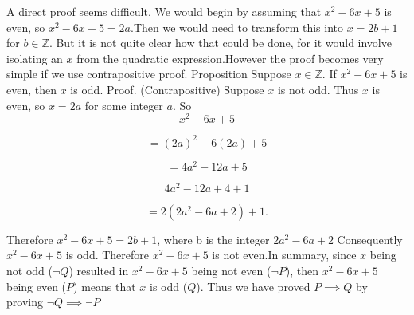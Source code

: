 \documentclass{exam}
\begin{document}
\begin{questions}
\begin{solution}
A direct proof seems difficult. We would begin by assuming that
$x^{2} - 6x + 5$ is even, so $x^{2} - 6x + 5 = 2a$.\newline \newline Then we would need to transform this
into $x = 2b + 1$ for $b \in \mathbb{Z}$. But it is not quite clear how that could be done,
for it would involve isolating an $x$ from the quadratic expression.\newline \newline However
the proof becomes very simple if we use contrapositive proof.\newline \newline
Proposition Suppose $x \in \mathbb{Z}$. If $x^{2} - 6x + 5$ is even, then $x$ is odd. \newline\newline
Proof. (Contrapositive) Suppose $x$ is not odd.
Thus $x$ is even, so $x = 2a$ for some integer $a$.
So
\begin{equation}
     x^{2}-6x+5
\end{equation}

\begin{equation}
  = (2a)^{2}-6(2a)+5
\end{equation}
  
\begin{equation}
    = 4a^{2}-12a+5
\end{equation}

\begin{equation}
    4a^{2} -12a+4+1
\end{equation}

\begin{equation}
      = 2(2a^{2}-6a+2)+1.
\end{equation}

Therefore $x^{2} - 6x + 5 = 2b + 1$, where b is the integer $2a^{2} - 6a + 2$ \newline \newline
Consequently $x^{2} - 6x + 5$ is odd.
Therefore $x^{2} - 6x + 5$ is not even.\newline \newline In summary, since $x$ being not odd ($\neg Q$) resulted in $x^{2} - 6x +5$ being not
even ($\neg P$), then $x^{2} - 6x + 5$ being even ($P$) means that $x$ is odd ($Q$). \newline \newline Thus
we have proved  $P \implies Q$  by proving $\neg Q \implies \neg P$
\end{solution}


    
\end{questions}
\end{document}
